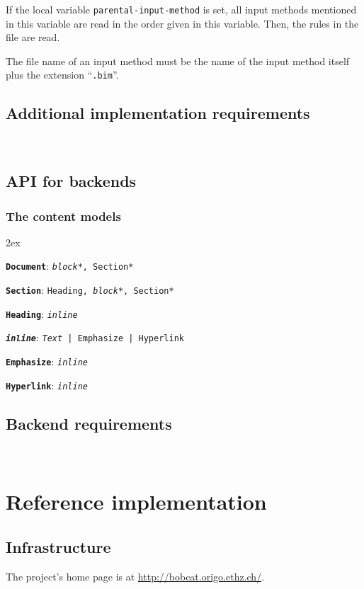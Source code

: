 \documentclass[12pt,openany]{book}
\begin{document}
If the local variable \verb|parental-input-method| is set, all input methods
mentioned in this variable are read in the order given in this variable.  Then,
the rules in the file are read.

The file name of an input method must be the name of the input method itself
plus the extension ``\verb|.bim|''.

\section{Additional implementation requirements}

~

\section{API for backends}

\subsection{The content models}

\begingroup\parindent0pt\parskip2ex
\newcommand{\element}[2]{\texttt{\textbf{#1}}: \texttt{#2}}

\element{Document}{\textit{block}*, Section*}

\element{Section}{Heading, \textit{block}*, Section*}

\element{Heading}{\textit{inline}}

\element{\textit{inline}}{\textit{Text} | Emphasize | Hyperlink}

\element{Emphasize}{\textit{inline}}

\element{Hyperlink}{\textit{inline}}

\endgroup

\section{Backend requirements}

~


\chapter{Reference implementation}

\section{Infrastructure}

The project's home page is at \url{http://bobcat.origo.ethz.ch/}.
\end{document}
